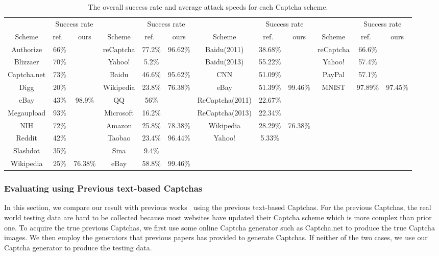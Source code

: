 \begin{table}[t]
    \centering
    \caption{The overall success rate and average attack speeds for each Captcha scheme.}
    \label{table: overall_rate}
    \scriptsize
    \begin{tabular}{|c|c|c|c|c|c|c|c|c|c|c|c|}
        \hline
        & \multicolumn{2}{|c|}{Success rate}& & \multicolumn{2}{|c|}{Success rate} & &\multicolumn{2}{|c|}{Success rate} & & \multicolumn{2}{|c|}{Success rate}\\
        \cline{2-3} \cline{5-6} \cline{8-9} \cline{11-12}
        \multirow{-2}{*}{Scheme} & ref.~\cite{Bursztein2011Text} & ours & \multirow{-2}{*}{Scheme} & ref.~\cite{Gao2016A} & ours & \multirow{-2}{*}{Scheme} & ref.~\cite{Bursztein2014The} & ours & \multirow{-2}{*}{Scheme} & ref.~\cite{George2017A} & ours \\
        \hline
        Authorize & 66\% & & reCaptcha & 77.2\% & 96.62\% & Baidu(2011) & 38.68\% & & reCaptcha & 66.6\% & \\
        \hline
        Blizzaer & 70\% & & Yahoo! & 5.2\% & & Baidu(2013) & 55.22\% & & Yahoo! & 57.4\% & \\
        \hline
        Captcha.net & 73\% & & Baidu & 46.6\% & 95.62\% & CNN & 51.09\% & & PayPal & 57.1\% & \\
        \hline
        Digg & 20\% & & Wikipedia & 23.8\% & 76.38\% & eBay & 51.39\% & 99.46\% & MNIST & 97.89\% & 97.45\% \\
        \hline
        eBay & 43\% & 98.9\% & QQ & 56\% & & ReCaptcha(2011) & 22.67\% & & & &\\
        \hline
        Megaupload & 93\% & & Microsoft & 16.2\% & & ReCaptcha(2013) & 22.34\% & & & & \\
        \hline
        NIH & 72\% & & Amazon & 25.8\% & 78.38\% & Wikipedia & 28.29\% & 76.38\% & & & \\
        \hline
        Reddit & 42\% & & Taobao & 23.4\% & 96.44\% & Yahoo! & 5.33\% & & & &  \\
        \hline
        Slashdot & 35\% & & Sina & 9.4\% & & & & & & & \\
        \hline
        Wikipedia & 25\% & 76.38\% & eBay & 58.8\% & 99.46\% & & & & & & \\
        \hline
    \end{tabular}
\end{table}

\subsubsection{Evaluating using Previous text-based Captchas}
In this section, we compare our result with previous works~\cite{Bursztein2011Text,Gao2016A,Bursztein2014The} using the previous text-based Captchas.
For the previous Captchas, the real world testing data are hard to be collected because most websites have updated their Captcha scheme which is more complex than prior one. To acquire the true previous Captchas, we first use some online Captcha generator such as Captcha.net to produce the true Captcha images. We then employ the generators that previous papers has provided to generate Captchas. If neither of the two cases, we use our Captcha generator to produce the testing data.

